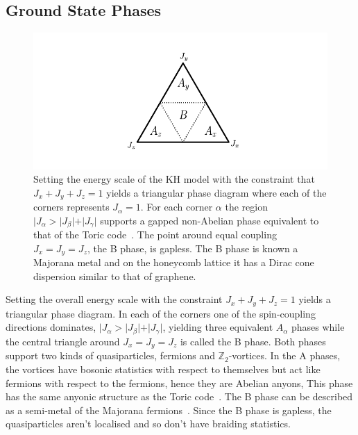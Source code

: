 \hypertarget{ground-state-phases}{%
\subsection{Ground State Phases}\label{ground-state-phases}}

\hypertarget{fig:KH_phase_diagram}{%
\begin{figure}
\centering
\includegraphics[width=1\textwidth,height=\textheight]{figure_code/background_chapter/KH_phase_diagram}
\caption[{Kitaev Honeycomb Model Phase Diagram}]{Setting the energy scale of the KH model with the constraint that \(J_x + J_y + J_z = 1\) yields a triangular phase diagram where each of the corners represents \(J_\alpha = 1\). For each corner \(\alpha\) the region \(|J_\alpha > |J_\beta| + |J_\gamma|\) supports a gapped non-Abelian phase equivalent to that of the Toric code~\autocite{kitaev1997quantum,kitaev_fault-tolerant_2003}. The point around equal coupling \(J_x = J_y = J_z\), the B phase, is gapless. The B phase is known a Majorana metal and on the honeycomb lattice it has a Dirac cone dispersion similar to that of graphene.}
\label{fig:KH_phase_diagram}
\end{figure}
}

Setting the overall energy scale with the constraint \(J_x + J_y + J_z = 1\) yields a triangular phase diagram. In each of the corners one of the spin-coupling directions dominates, \(|J_\alpha > |J_\beta| + |J_\gamma|\), yielding three equivalent \(A_\alpha\) phases while the central triangle around \(J_x = J_y = J_z\) is called the B phase. Both phases support two kinds of quasiparticles, fermions and \(\mathbb{Z}_2\)-vortices. In the A phases, the vortices have bosonic statistics with respect to themselves but act like fermions with respect to the fermions, hence they are Abelian anyons, This phase has the same anyonic structure as the Toric code~\autocite{kitaev_fault-tolerant_2003}. The B phase can be described as a semi-metal of the Majorana fermions~\autocite{TrebstPhysRep2022}. Since the B phase is gapless, the quasiparticles aren't localised and so don't have braiding statistics.

